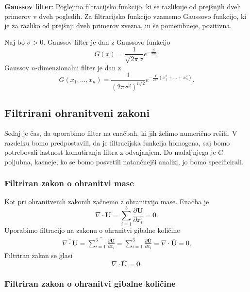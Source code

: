 \documentclass[mat2, tisk]{fmfdelo}
\newcommand{\bd}{\textbf}
\begin{document}
\noindent
\textbf{Gaussov filter}:
Poglejmo filtracijsko funkcijo, ki se razlikuje od prejšnjih dveh primerov v dveh pogledih.
Za filtracijsko funkcijo vzamemo Gaussovo funkcijo, ki je za razliko od prejšnji dveh 
primerov zvezna, in še pomembneje, pozitivna.
\begin{definicija}
Naj bo $\sigma > 0$. Gaussov filter je dan z Gaussovo funkcijo 
\begin{equation*}
G(x) = \frac{1}{\sqrt{2\pi}\sigma} e^{-\frac{x^2}{2\sigma^2}}.
\end{equation*}
Gaussov $n$-dimenzionalni filter je dan z 
\begin{equation*}
G(x_1, \dots, x_n) = \frac{1}{(2\pi \sigma^2)^{n/2}} e^{-\frac{1}{2\sigma^2}(x_1^2 + \dots + x_n^2)}.
\end{equation*}
\end{definicija}


\subsection{Filtrirani ohranitveni zakoni}

Sedaj je čas, da uporabimo filter na enačbah, ki jih želimo numerično rešiti. V 
razdelku bomo predpostavili, da je filtracijska funkcija homogena, saj bomo potrebovali 
lastnost komutiranja filtra z odvajanjem. Do nadaljnjega je $G$ poljubna, 
kasneje, ko se bomo posvetili natančnejši analizi, jo bomo specificirali.

\subsubsection{Filtriran zakon o ohranitvi mase}
Kot pri ohranitvenih zakonih začnemo z ohranitvijo mase. Enačba je
$$
\nabla\cdot \bd{U} = \sum_{i=1}^3 \frac{\partial \bd{U}}{\partial x_i} = \bd{0}.
$$
\noindent
Uporabimo filtracijo na zakonu o ohranitvi gibalne količine
\begin{align*}
\overline{\nabla\cdot \bd{U}}= \overline{\sum_{i=1}^3 \frac{\partial \bd{U}}{\partial x_i}} = 
\sum_{i=1}^3 \frac{\partial \overline{\bd{U}}}{\partial x_i} = \nabla\cdot \overline{\bd{U}} = 0.
\end{align*}
\noindent
Filtriran zakon se glasi
\begin{equation*}
\nabla\cdot\overline{\bd{U}} = \bd{0}.
\end{equation*}

\subsubsection{Filtriran zakon o ohranitvi gibalne količine}
\end{document}
